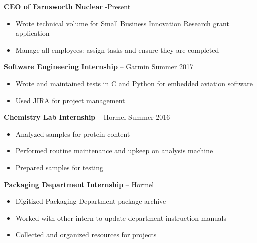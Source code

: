 \documentclass{article}
\begin{document}
\begin{minipage}[t]{15cm}



\begin{centering}

\vspace{0.2cm}
\textbf{CEO of Farnsworth Nuclear} -Present
\begin{itemize}
\itemsep-0.3em
\item Wrote technical volume for Small Business Innovation Research grant application
\item Manage all employees: assign tasks and ensure they are completed
\end{itemize}

\vspace{0.2cm}
\textbf{Software Engineering Internship} -- Garmin \dotfill Summer 2017
\begin{itemize}
\itemsep-0.3em
\item Wrote and maintained tests in C and Python for embedded aviation software
\item Used JIRA for project management
\end{itemize}

\vspace{0.2cm}
\textbf{Chemistry Lab Internship} -- Hormel \dotfill Summer 2016
\begin{itemize}
\itemsep-0.3em
\item Analyzed samples for protein content
\item Performed routine maintenance and upkeep on analysis machine
\item Prepared samples for testing
\end{itemize}
\end{centering}

\vspace{0.2cm}
\textbf{Packaging Department Internship} -- Hormel 

\begin{itemize}
\itemsep-0.3em
\item Digitized Packaging Department package archive
\item Worked with other intern to update department instruction manuals 
\item Collected and organized resources for projects
\end{itemize}


\end{minipage}
\end{document}
